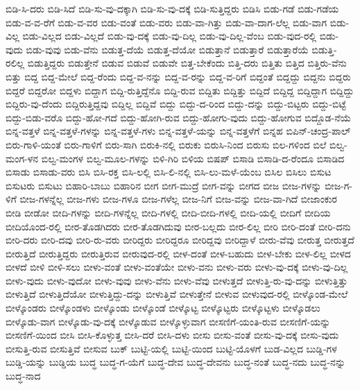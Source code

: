 {ಬಿಡಿ-ಸಿ-ದರು
ಬಿಡಿ-ಸಿದೆ
ಬಿಡಿ-ಸು-ವು-ದಕ್ಕಾಗಿ
ಬಿಡಿ-ಸು-ವು-ದಕ್ಕೆ
ಬಿಡಿ-ಸುತ್ತಿದ್ದರು
ಬಿಡಿಸಿ
ಬಿಡು-ಗಡೆ
ಬಿಡು-ಗಡೆಯ
ಬಿಡು-ವ-ವ-ರೆಗೆ
ಬಿಡು-ವ-ವರ
ಬಿಡು-ವಂತೆ
ಬಿಡು-ವರು
ಬಿಡು-ವಾ-ಗಿತ್ತು
ಬಿಡು-ವಾ-ದಾಗ-ಲೆಲ್ಲ
ಬಿಡು-ವಾಗ
ಬಿಡು-ವಿಲ್ಲ
ಬಿಡು-ವಿಲ್ಲದ
ಬಿಡು-ವಿಲ್ಲದೆ
ಬಿಡು-ವು-ದಕ್ಕೆ
ಬಿಡು-ವು-ದಿಲ್ಲ
ಬಿಡು-ವು-ದಿಲ್ಲ-ವೆಂಬ
ಬಿಡು-ವುದ-ರಲ್ಲಿ
ಬಿಡು-ವುದು
ಬಿಡು-ವುವು
ಬಿಡು-ವೆನು
ಬಿಡುತ್ತ-ದೆಯೆ
ಬಿಡುತ್ತ-ದೆಯೋ
ಬಿಡುತ್ತಾನೆ
ಬಿಡುತ್ತಾರೆ
ಬಿಡುತ್ತಾರೆಯೆ
ಬಿಡುತ್ತಿ-ರಲಿಲ್ಲ
ಬಿಡುತ್ತಿದ್ದರು
ಬಿಡುತ್ತೇನೆ
ಬಿಡುವ
ಬಿಡುವೆ
ಬಿಡುವೇ
ಬಿತ್ತ-ಬೇಕೆಂದು
ಬಿತ್ತಿ-ದರು
ಬಿತ್ತಿತು
ಬಿತ್ತಿದ
ಬಿತ್ತಿರು-ವೆನು
ಬಿತ್ತು
ಬಿದ್ದ
ಬಿದ್ದ-ಮೇಲೆ
ಬಿದ್ದ-ರೆಂದು
ಬಿದ್ದ-ವ-ನನ್ನು
ಬಿದ್ದ-ವ-ರನ್ನು
ಬಿದ್ದ-ವ-ರಿಗೆ
ಬಿದ್ದಂತೆ
ಬಿದ್ದದ್ದು
ಬಿದ್ದನು
ಬಿದ್ದರು
ಬಿದ್ದರೆ
ಬಿದ್ದರೋ
ಬಿದ್ದಳು
ಬಿದ್ದಾಗ
ಬಿದ್ದಿ-ರುತ್ತಿದ್ದೆನೊ
ಬಿದ್ದಿ-ರುವ
ಬಿದ್ದಿತು
ಬಿದ್ದಿತ್ತು
ಬಿದ್ದಿದೆ
ಬಿದ್ದಿದ್ದ
ಬಿದ್ದಿದ್ದಾಗ
ಬಿದ್ದಿದ್ದು
ಬಿದ್ದಿರು-ವು-ದೆಂದು
ಬಿದ್ದಿರುತ್ತಿದ್ದವು
ಬಿದ್ದಿಲ್ಲ
ಬಿದ್ದಿವೆ
ಬಿದ್ದು
ಬಿದ್ದು-ದ-ರಿಂದ
ಬಿದ್ದು-ದನ್ನು
ಬಿದ್ದು-ಬಿಟ್ಟರು
ಬಿದ್ದು-ಬಿಟ್ಟೆ
ಬಿದ್ದು-ಬಿಡು-ವರೊ
ಬಿದ್ದು-ಹೋ-ಗದೆ
ಬಿದ್ದು-ಹೋಗಿ-ರುವ
ಬಿದ್ದು-ಹೋಗು-ವುದು
ಬಿದ್ದು-ಹೋಗುವ
ಬಿದ್ದೊಡ-ನೆಯೆ
ಬಿನ್ನ-ವತ್ತಳೆ
ಬಿನ್ನ-ವತ್ತಳೆ-ಗಳನ್ನು
ಬಿನ್ನ-ವತ್ತಳೆ-ಗಳು
ಬಿನ್ನ-ವತ್ತಳೆ-ಯನ್ನು
ಬಿನ್ನ-ವತ್ತಳೆಗೆ
ಬಿನ್ನಹ
ಬಿಪಿನ್-ಚಂದ್ರ-ಪಾಲ್
ಬಿರು-ಗಾಳಿ-ಯಂತೆ
ಬಿರು-ಗಾಳಿಗೆ
ಬಿರು-ಸಾಗಿ
ಬಿರುಕಿ-ನಲ್ಲಿ
ಬಿರುಕು
ಬಿರುಸಿ-ನಿಂದ
ಬಿರುಸು
ಬಿಲ-ಗಳಿಂದ
ಬಿಲೆ
ಬಿಲ್ವ-ಮಂಗ-ಳನ
ಬಿಲ್ವ-ಮಂಗಳ
ಬಿಲ್ವ-ಮೂಲ-ಗಳನ್ನು
ಬಿಳಿ-ಗಿರಿ
ಬಿಳಿಯ
ಬಿಷಪ್
ಬಿಸಾಡಿ
ಬಿಸಾಡಿ-ದ-ರೆಂದೂ
ಬಿಸಾಡಿದ
ಬಿಸಾಡು
ಬಿಸಾಡು-ವರು
ಬಿಸಿ
ಬಿಸಿ-ರಕ್ತ
ಬಿಸಿ-ಲಲ್ಲಿ
ಬಿಸಿ-ಲಿ-ನಲ್ಲಿ
ಬಿಸಿ-ಲು-ಮಳೆ-ಯೆಂಬ
ಬಿಸಿಲ
ಬಿಸಿಲು
ಬಿಸುಟ
ಬಿಸುಟರು
ಬಿಸುಟು
ಬಿಹಾರಿ-ಬಾಬು
ಬಿಹಾರಿನ
ಬೀಗ
ಬೀಗ-ಮುದ್ರೆ
ಬೀಗ-ವನ್ನು
ಬೀಗದ
ಬೀಜ
ಬೀಜ-ಗಳನ್ನು
ಬೀಜ-ಗ-ಳಿಗೆ
ಬೀಜ-ಗಳನ್ನೆಲ್ಲ
ಬೀಜ-ಗಳು
ಬೀಜ-ಗಳೂ
ಬೀಜ-ಗಳೆಲ್ಲ
ಬೀಜ-ನಿಗೆ
ಬೀಜ-ವನ್ನು
ಬೀಜ-ವಾ-ಗಿದೆ
ಬೀಜಾಂಕುರ
ಬೀಡಿ
ಬೀಡೋ
ಬೀದಿ-ಗಳನ್ನು
ಬೀದಿ-ಗಳನ್ನೆಲ್ಲ
ಬೀದಿ-ಗಳಲ್ಲಿ
ಬೀದಿ-ಬೀದಿ-ಗಳಲ್ಲಿ
ಬೀದಿ-ಯಲ್ಲಿ
ಬೀದಿಗೆ
ಬೀದಿಯ
ಬೀದಿಯೊಂದ-ರಲ್ಲಿ
ಬೀರ-ತೊಡಗಿದರು
ಬೀರ-ತೊಡಗಿದುವು
ಬೀರ-ಬಲ್ಲದು
ಬೀರ-ಲಿಲ್ಲ
ಬೀರಿ
ಬೀರಿ-ದಂತೆ
ಬೀರಿ-ದನು
ಬೀರಿ-ದರು
ಬೀರಿ-ದವು
ಬೀರಿ-ರು-ವರು
ಬೀರಿದ್ದರು
ಬೀರಿದ್ದರೂ
ಬೀರಿದ್ದವು
ಬೀರಿದ್ದಾಳೆ
ಬೀರು-ವೆವು
ಬೀರುತ್ತ
ಬೀರುತ್ತದೆ
ಬೀರುತ್ತಿದೆ
ಬೀರುತ್ತಿದ್ದರು
ಬೀರುತ್ತಿರುವ
ಬೀರುವುದ-ರಲ್ಲಿ
ಬೀಳ-ದಂತೆ
ಬೀಳ-ಬಹುದು
ಬೀಳ-ಬೇಕು
ಬೀಳ-ಲಿಲ್ಲ
ಬೀಳದ
ಬೀಳದೆ
ಬೀಳಿ
ಬೀಳಿ-ಸಲು
ಬೀಳು-ವಂತೆ
ಬೀಳು-ವಂತೆಯೇ
ಬೀಳು-ವನು
ಬೀಳು-ವರು
ಬೀಳು-ವು-ದಕ್ಕೆ
ಬೀಳು-ವು-ದಿಲ್ಲ
ಬೀಳು-ವುದು
ಬೀಳು-ವುದೋ
ಬೀಳು-ವುವು
ಬೀಳು-ವೆನು
ಬೀಳು-ವೆವು
ಬೀಳುತ್ತದೆ
ಬೀಳುತ್ತಿ-ರು-ವು-ದನ್ನು
ಬೀಳುತ್ತಿತ್ತು
ಬೀಳುತ್ತಿದೆ
ಬೀಳುತ್ತಿದೆಯೋ
ಬೀಳುತ್ತಿದ್ದು-ದನ್ನು
ಬೀಳುತ್ತಿವೆ
ಬೀಳುತ್ತೇನೆ
ಬೀಳುವ
ಬೀಳುವುದ-ರಲ್ಲಿ
ಬೀಳ್ಕೊಂಡ-ಮೇಲೆ
ಬೀಳ್ಕೊಂಡರು
ಬೀಳ್ಕೊಂಡಳು
ಬೀಳ್ಕೊಂಡು
ಬೀಳ್ಕೊಂಡೆ
ಬೀಳ್ಕೊಟ್ಟ
ಬೀಳ್ಕೊಟ್ಟರು
ಬೀಳ್ಕೊಟ್ಟಳು
ಬೀಳ್ಕೊಡಲು
ಬೀಳ್ಕೊಡು-ವಾಗ
ಬೀಳ್ಕೊಡು-ವು-ದಕ್ಕೆ
ಬೀಳ್ಕೊಡುವ
ಬೀಳ್ಕೊಳ್ಳುವಾಗ
ಬೀಸಣಿಗೆ-ಯಂತಿ-ರುವ
ಬೀಸಣಿಗೆ-ಯನ್ನು
ಬೀಸಣಿಗೆ-ಯಿಂದ
ಬೀಸಿ
ಬೀಸಿ-ಕೊಳ್ಳುತ್ತ
ಬೀಸಿ-ದರೆ
ಬೀಸಿ-ದಳು
ಬೀಸು
ಬೀಸು-ವಂತೆ
ಬೀಸು-ವು-ದಕ್ಕೆ
ಬೀಸು-ವುದು
ಬೀಸುತ್ತಿ-ರುವ
ಬೀಸುತ್ತಿವೆ
ಬೀಸುವ
ಬುಕ್
ಬುಟ್ಟಿ-ಯಲ್ಲಿ
ಬುಟ್ಟಿ-ಯಿಂದ
ಬುಟ್ಟಿ-ಯೊಳಗೆ
ಬುಡ-ವಿಲ್ಲದ
ಬುಡ್ಡಿ-ಗಳ
ಬುಡ್ಡಿ-ಯನ್ನು
ಬುಡ್ಡಿಯ
ಬುದ್ಧ
ಬುದ್ಧ-ಗ-ಯೆಗೆ
ಬುದ್ಧ-ದೇವ
ಬುದ್ಧ-ದೇವನು
ಬುದ್ಧ-ನಂತೆ
ಬುದ್ಧ-ನದು
ಬುದ್ಧ-ನನ್ನು
ಬುದ್ಧ-ನಾದ
}
